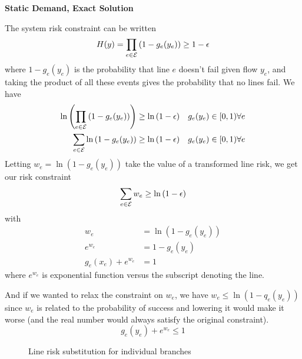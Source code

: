 \textbf{Static Demand, Exact Solution}

The system risk constraint can be written
\begin{equation*} H(y) = \prod_{e \in \mathcal{E}} \left( 1 - g_e(y_e) \right) \geq 1 - \epsilon
  \end{equation*}  
where $1 - g_e(y_e)$ is the probability that line $e$ doesn't fail given flow $y_e$, and taking the product of all these events gives the probability that no lines fail.  We have
\begin{align*}
  \ln \left( \prod_{e \in \mathcal{E}}\left( 1 - g_e(y_e)\right) \right) &\geq \ln \left(  1 - \epsilon \right)  & g_e(y_e) \in [0,1) \forall e  \\
  \sum_{e \in \mathcal{E}} \ln \left( 1-g_e(y_e) \right)  &\geq \ln \left( 1- \epsilon \right) & g_e(y_e) \in [0,1) \forall e 
\end{align*}
Letting $w_e = \ln \left( 1 -g_e(y_e) \right)$ take the value of a transformed line risk, we get our risk constraint
\begin{equation} \label{cceqn}
\sum_{e \in \mathcal{E}} w_e \geq \ln \left( 1-\epsilon \right)
\end{equation}
with
\begin{align*}
w_e &= \ln \left( 1 - g_e(y_e)\right) \\
e^{w_e} &= 1-g_e(y_e) \\
g_e(x_e) + e^{w_e} &= 1 
\end{align*}
where $e^{w_e}$ is exponential function versus the subscript denoting the line.

And if we wanted to relax the constraint on $w_e$, we have $w_e \leq \ln \left( 1 - q_e(y_e) \right)$ since $w_e$ is related to the probability of success and lowering it would make it worse (and the real number would always satisfy the original constraint).
\begin{equation*}
g_e(y_e) + e^{w_e} \leq 1
\end{equation*}


\begin{figure}
\begin{center} 

\end{center}
\caption{Line risk substitution for individual branches}
\end{figure}
